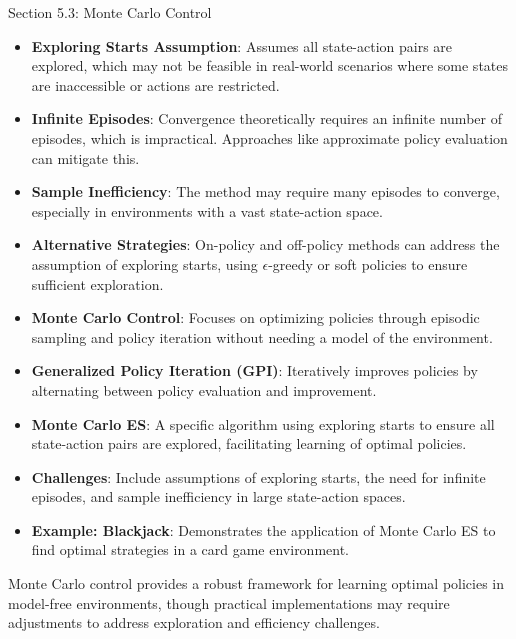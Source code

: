 \begin{notes}{Section 5.3: Monte Carlo Control}
\begin{highlight}
        \begin{itemize}
            \item \textbf{Exploring Starts Assumption}: Assumes all state-action pairs are explored, which may not be feasible in real-world scenarios where some states are inaccessible or actions are restricted.
            \item \textbf{Infinite Episodes}: Convergence theoretically requires an infinite number of episodes, which is impractical. Approaches like approximate policy evaluation can mitigate this.
            \item \textbf{Sample Inefficiency}: The method may require many episodes to converge, especially in environments with a vast state-action space.
            \item \textbf{Alternative Strategies}: On-policy and off-policy methods can address the assumption of exploring starts, using $\epsilon$-greedy or soft policies to ensure sufficient exploration.
        \end{itemize}
    
    \end{highlight}
    
    \begin{highlight}
    
        \begin{itemize}
            \item \textbf{Monte Carlo Control}: Focuses on optimizing policies through episodic sampling and policy iteration without needing a model of the environment.
            \item \textbf{Generalized Policy Iteration (GPI)}: Iteratively improves policies by alternating between policy evaluation and improvement.
            \item \textbf{Monte Carlo ES}: A specific algorithm using exploring starts to ensure all state-action pairs are explored, facilitating learning of optimal policies.
            \item \textbf{Challenges}: Include assumptions of exploring starts, the need for infinite episodes, and sample inefficiency in large state-action spaces.
            \item \textbf{Example: Blackjack}: Demonstrates the application of Monte Carlo ES to find optimal strategies in a card game environment.
        \end{itemize}
    
        Monte Carlo control provides a robust framework for learning optimal policies in model-free environments, though practical implementations may require adjustments to address exploration and efficiency challenges.
    
    \end{highlight}
\end{notes}

